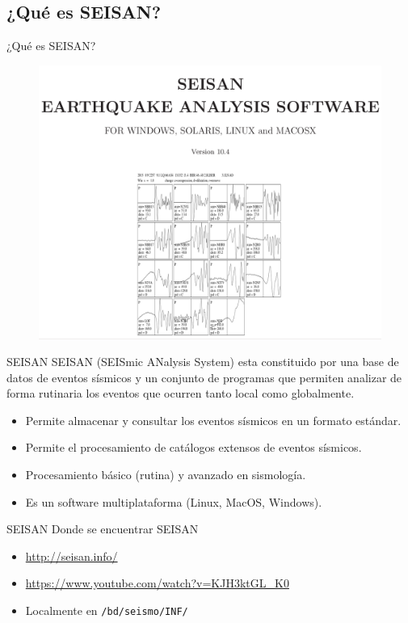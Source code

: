 \documentclass[11pt]{beamer}
\begin{document}
\subsection{¿Qué es SEISAN?}
\begin{frame}{¿Qué es SEISAN?}
\begin{figure}
\includegraphics[scale=0.2]{seisan_portada.png}
\end{figure}
\end{frame}
\begin{frame}{SEISAN}
SEISAN (SEISmic ANalysis System) esta constituido por una base de datos de eventos sísmicos y un conjunto de programas que permiten analizar de forma rutinaria los eventos que ocurren tanto local como globalmente. 
\begin{itemize}
\item Permite almacenar y consultar los eventos sísmicos en un formato estándar.\\
\pause
\item Permite el procesamiento de catálogos extensos de eventos sísmicos.\\
\pause
\item Procesamiento básico (rutina) y avanzado en sismología.
\pause
\item Es un software multiplataforma (Linux, MacOS, Windows).\\
\pause
\end{itemize}
\end{frame}
\begin{frame}{SEISAN}
Donde se encuentrar SEISAN
\begin{itemize}
\item \url{http://seisan.info/}
\item \url{https://www.youtube.com/watch?v=KJH3ktGL_K0}
\item Localmente en {\tt /bd/seismo/INF/}
\end{itemize}
\end{frame}
\end{document}
